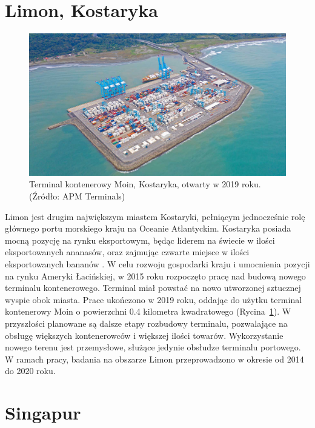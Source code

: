 \documentclass{amuthesis}
\begin{document}
\hypertarget{limon-kostaryka}{%
\section{Limon, Kostaryka}\label{limon-kostaryka}}

\begin{figure}[t]

{\centering \includegraphics[width=1\textwidth,height=\textheight]{figures/costarica/costarica_aoi.jpg}

}

\caption{\label{fig-cr_aoi}Terminal kontenerowy Moin, Kostaryka, otwarty
w 2019 roku. (Źródło: APM Terminals)}

\end{figure}

Limon jest drugim największym miastem Kostaryki, pełniącym jednocześnie
rolę głównego portu morskiego kraju na Oceanie Atlantyckim. Kostaryka
posiada mocną pozycję na rynku eksportowym, będąc liderem na świecie w
ilości eksportowanych ananasów, oraz zajmując czwarte miejsce w ilości
eksportowanych bananów \autocite{notteboom2022port}. W celu rozwoju
gospodarki kraju i umocnienia pozycji na rynku Ameryki Łacińskiej, w
2015 roku rozpoczęto pracę nad budową nowego terminalu kontenerowego.
Terminal miał powstać na nowo utworzonej sztucznej wyspie obok miasta.
Prace ukończono w 2019 roku, oddając do użytku terminal kontenerowy Moin
o powierzchni 0.4 kilometra kwadratowego (Rycina~\ref{fig-cr_aoi}). W
przyszłości planowane są dalsze etapy rozbudowy terminalu, pozwalające
na obsługę większych kontenerowców i większej ilości towarów.
Wykorzystanie nowego terenu jest przemysłowe, służące jedynie obsłudze
terminalu portowego. W ramach pracy, badania na obszarze Limon
przeprowadzono w okresie od 2014 do 2020 roku.

\hypertarget{singapur}{%
\section{Singapur}\label{singapur}}
\end{document}
